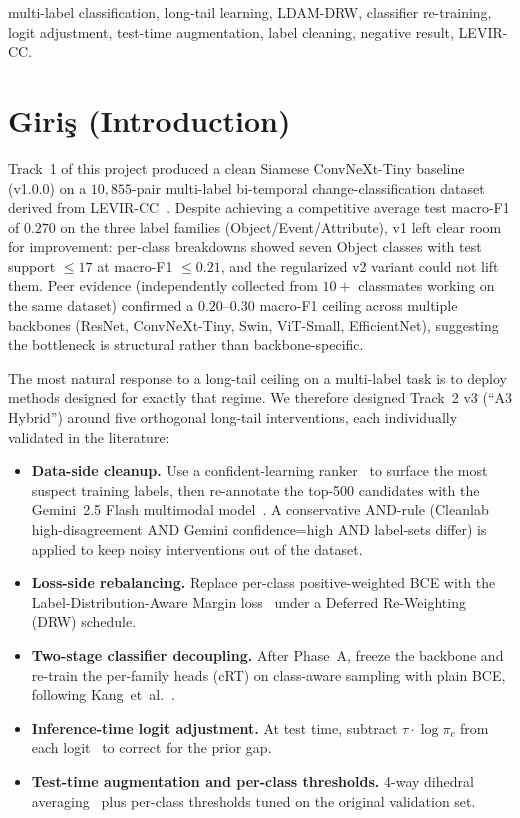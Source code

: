 \documentclass[journal]{IEEEtran}
\begin{document}
\begin{IEEEkeywords}
multi-label classification, long-tail learning, LDAM-DRW, classifier re-training, logit adjustment, test-time augmentation, label cleaning, negative result, LEVIR-CC.
\end{IEEEkeywords}

\section{Giri\c{s} (Introduction)}\label{sec:giris}
Track~1 of this project produced a clean Siamese ConvNeXt-Tiny baseline (v1.0.0) on a $10{,}855$-pair multi-label bi-temporal change-classification dataset derived from LEVIR-CC~\cite{liu2022levircc}. Despite achieving a competitive average test macro-F1 of $0.270$ on the three label families (Object/Event/Attribute), v1 left clear room for improvement: per-class breakdowns showed seven Object classes with test support $\le 17$ at macro-F1 $\le 0.21$, and the regularized v2 variant could not lift them. Peer evidence (independently collected from $10+$ classmates working on the same dataset) confirmed a $0.20$--$0.30$ macro-F1 ceiling across multiple backbones (ResNet, ConvNeXt-Tiny, Swin, ViT-Small, EfficientNet), suggesting the bottleneck is structural rather than backbone-specific.

The most natural response to a long-tail ceiling on a multi-label task is to deploy methods designed for exactly that regime. We therefore designed Track~2 v3 (``A3 Hybrid'') around five orthogonal long-tail interventions, each individually validated in the literature:
\begin{itemize}
  \item \textbf{Data-side cleanup.} Use a confident-learning ranker~\cite{northcutt2021cleanlab} to surface the most suspect training labels, then re-annotate the top-500 candidates with the Gemini~2.5 Flash multimodal model~\cite{google2024gemini}. A conservative AND-rule (Cleanlab high-disagreement AND Gemini confidence=high AND label-sets differ) is applied to keep noisy interventions out of the dataset.
  \item \textbf{Loss-side rebalancing.} Replace per-class positive-weighted BCE with the Label-Distribution-Aware Margin loss~\cite{cao2019ldam} under a Deferred Re-Weighting (DRW) schedule.
  \item \textbf{Two-stage classifier decoupling.} After Phase~A, freeze the backbone and re-train the per-family heads (cRT) on class-aware sampling with plain BCE, following Kang~et~al.~\cite{kang2020decoupling}.
  \item \textbf{Inference-time logit adjustment.} At test time, subtract $\tau\!\cdot\!\log\pi_c$ from each logit~\cite{menon2021logitadjust} to correct for the prior gap.
  \item \textbf{Test-time augmentation and per-class thresholds.} 4-way dihedral averaging~\cite{wang2019tta} plus per-class thresholds tuned on the original validation set.
\end{itemize}
\end{document}

